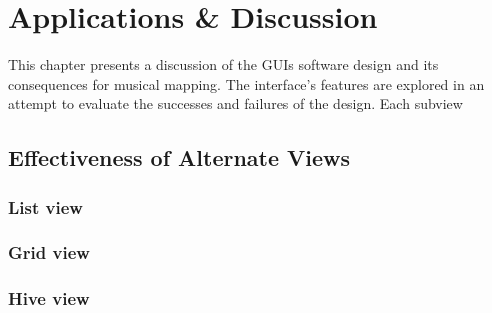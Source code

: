 \chapter{Applications \& Discussion}

This chapter presents a discussion of the GUIs software design and its consequences for musical mapping. The interface's features are explored in an attempt to evaluate the successes and failures of the design. Each subview 

\section{Effectiveness of Alternate Views} %
\label{sec:effectiveness_of_alternate_views}

	\subsection{List view} %
	\label{sub:list_view}

	

	\subsection{Grid view} %
	\label{sub:grid_view}
	

	\subsection{Hive view} %
	\label{sub:hive_view}

	


